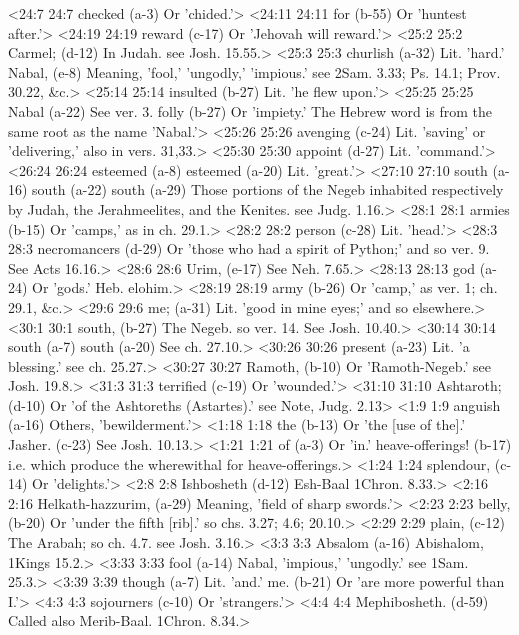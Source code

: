 <24:7 24:7  checked (a-3)  Or 'chided.'>
<24:11 24:11  for (b-55)  Or 'huntest after.'>
<24:19 24:19  reward (c-17)  Or 'Jehovah will reward.'>
<25:2 25:2  Carmel; (d-12)  In Judah. see Josh. 15.55.>
<25:3 25:3  churlish (a-32)  Lit. 'hard.'
  Nabal, (e-8)  Meaning, 'fool,' 'ungodly,' 'impious.' see 2Sam. 3.33; Ps.  14.1; Prov. 30.22, &c.>
<25:14 25:14  insulted (b-27)  Lit. 'he flew upon.'>
<25:25 25:25  Nabal (a-22)  See ver. 3.
  folly (b-27)  Or 'impiety.' The Hebrew word is from the same root as the  name 'Nabal.'>
<25:26 25:26  avenging (c-24)  Lit. 'saving' or 'delivering,' also in vers. 31,33.>
<25:30 25:30  appoint (d-27)  Lit. 'command.'>
<26:24 26:24  esteemed (a-8)  esteemed (a-20)
  Lit. 'great.'>
<27:10 27:10  south (a-16)  south (a-22)  south (a-29)
  Those portions of the Negeb inhabited respectively by  Judah, the Jerahmeelites, and the Kenites. see Judg. 1.16.>
<28:1 28:1  armies (b-15)  Or 'camps,' as in ch. 29.1.>
<28:2 28:2  person (c-28)  Lit. 'head.'>
<28:3 28:3  necromancers (d-29)  Or 'those who had a spirit of Python;' and so ver. 9. See  Acts 16.16.>
<28:6 28:6  Urim, (e-17)  See Neh. 7.65.>
<28:13 28:13  god (a-24)  Or 'gods.' Heb. elohim.>
<28:19 28:19  army (b-26)  Or 'camp,' as ver. 1; ch. 29.1, &c.>
<29:6 29:6  me; (a-31)  Lit. 'good in mine eyes;' and so elsewhere.>
<30:1 30:1  south, (b-27)  The Negeb. so ver. 14. See Josh. 10.40.>
<30:14 30:14  south (a-7)  south (a-20)
  See ch. 27.10.>
<30:26 30:26  present (a-23)  Lit. 'a blessing.' see ch. 25.27.>
<30:27 30:27  Ramoth, (b-10)  Or 'Ramoth-Negeb.' see Josh. 19.8.>
<31:3 31:3  terrified (c-19)  Or 'wounded.'>
<31:10 31:10  Ashtaroth; (d-10)  Or 'of the Ashtoreths (Astartes).' see Note, Judg. 2.13>
<1:9 1:9  anguish (a-16)  Others, 'bewilderment.'>
<1:18 1:18  the (b-13)  Or 'the [use of the].'  Jasher. (c-23)  See Josh. 10.13.>
<1:21 1:21  of (a-3)  Or 'in.'  heave-offerings! (b-17)  i.e. which produce the wherewithal for heave-offerings.>
<1:24 1:24  splendour, (c-14)  Or 'delights.'>
<2:8 2:8  Ishbosheth (d-12)  Esh-Baal 1Chron. 8.33.>
<2:16 2:16  Helkath-hazzurim, (a-29)  Meaning, 'field of sharp swords.'>
<2:23 2:23  belly, (b-20)  Or 'under the fifth [rib].' so chs. 3.27; 4.6; 20.10.>
<2:29 2:29  plain, (c-12)  The Arabah; so ch. 4.7. see Josh. 3.16.>
<3:3 3:3  Absalom (a-16)  Abishalom, 1Kings 15.2.>
<3:33 3:33  fool (a-14)  Nabal, 'impious,' 'ungodly.' see 1Sam. 25.3.>
<3:39 3:39  though (a-7)  Lit. 'and.'
  me. (b-21)  Or 'are more powerful than I.'>
<4:3 4:3  sojourners (c-10)  Or 'strangers.'>
<4:4 4:4  Mephibosheth. (d-59)  Called also Merib-Baal. 1Chron. 8.34.>
